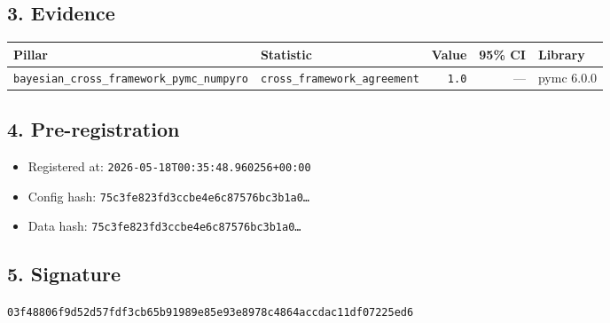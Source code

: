 \documentclass{article}
\begin{document}
\subsection*{3. Evidence}
\begin{tabular}{llrrl}\toprule
\textbf{Pillar} & \textbf{Statistic} & \textbf{Value} & \textbf{95\% CI} & \textbf{Library} \\\midrule
\texttt{bayesian\_cross\_framework\_pymc\_numpyro} & \texttt{cross\_framework\_agreement} & \texttt{1.0} & --- & pymc 6.0.0 \\
\bottomrule\end{tabular}
\subsection*{4. Pre-registration}
\begin{itemize}
\item Registered at: \texttt{2026-05-18T00:35:48.960256+00:00}
\item Config hash: \texttt{75c3fe823fd3ccbe4e6c87576bc3b1a0\dots}
\item Data hash: \texttt{75c3fe823fd3ccbe4e6c87576bc3b1a0\dots}
\end{itemize}
\subsection*{5. Signature}
\texttt{03f48806f9d52d57fdf3cb65b91989e85e93e8978c4864accdac11df07225ed6}\\
\end{document}
